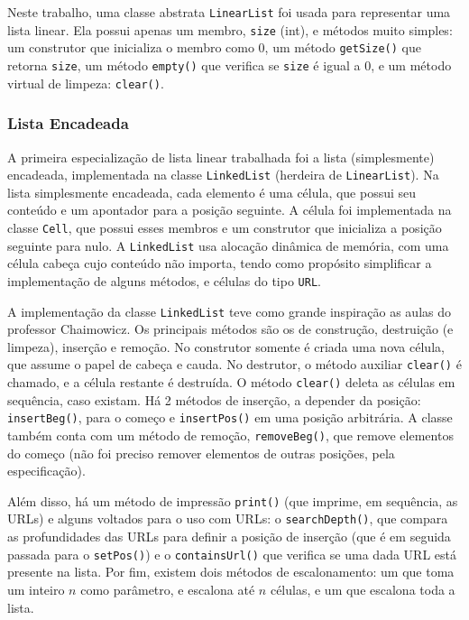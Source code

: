 \documentclass{article}
\def\code#1{\texttt{#1}}
\begin{document}
Neste trabalho, uma classe abstrata \code{LinearList} foi usada para representar uma lista linear. Ela possui apenas um membro, \code{size} (int), e métodos muito simples: um construtor que inicializa o membro como 0, um método \code{getSize()}  que retorna \code{size}, um método \code{empty()} que verifica se \code{size} é igual a 0, e um método virtual de limpeza: \code{clear()}.

\subsubsection{Lista Encadeada}

A primeira especialização de lista linear trabalhada foi a lista (simplesmente) encadeada, implementada na classe \code{LinkedList} (herdeira de \code{LinearList}). Na lista simplesmente encadeada, cada elemento é uma célula, que possui seu conteúdo e um apontador para a posição seguinte. A célula foi implementada na classe \code{Cell}, que possui esses membros e um construtor que inicializa a posição seguinte para nulo. A \code{LinkedList} usa alocação dinâmica de memória, com uma célula cabeça cujo conteúdo não importa, tendo como propósito simplificar a implementação de alguns métodos, e células do tipo \code{URL}.

A implementação da classe \code{LinkedList} teve como grande inspiração as aulas do professor Chaimowicz. Os principais métodos são os de construção, destruição (e limpeza), inserção e remoção. No construtor somente é criada uma nova célula, que assume o papel de cabeça e cauda. No destrutor, o método auxiliar \code{clear()} é chamado, e a célula restante é destruída. O método \code{clear()} deleta as células em sequência, caso existam. Há 2 métodos de inserção, a depender da posição: \code{insertBeg()}, para o começo e \code{insertPos()} em uma posição arbitrária. A classe também conta com um método de remoção, \code{removeBeg()}, que remove elementos do começo (não foi preciso remover elementos de outras posições, pela especificação).

Além disso, há um método de impressão \code{print()} (que imprime, em sequência, as URLs) e alguns voltados para o uso com URLs: o \code{searchDepth()}, que compara as profundidades das URLs para definir a posição de inserção (que é em seguida passada para o \code{setPos()}) e o \code{containsUrl()} que verifica se uma dada URL está presente na lista. Por fim, existem dois métodos de escalonamento: um que toma um inteiro \( n \) como parâmetro, e escalona até \( n \) células, e um que escalona toda a lista.
\end{document}
